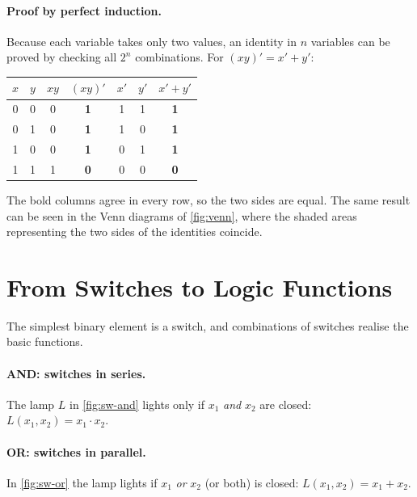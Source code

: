\paragraph{Proof by perfect induction.} Because each variable takes only two values, an identity in $n$ variables can be proved by checking all $2^n$ combinations. For $(xy)'=x'+y'$:

\begin{center}
\begin{tabular}{cc|cc|cc|c}
\toprule
$x$ & $y$ & $xy$ & $(xy)'$ & $x'$ & $y'$ & $x'+y'$\\
\midrule
0&0&0&\textbf{1}&1&1&\textbf{1}\\
0&1&0&\textbf{1}&1&0&\textbf{1}\\
1&0&0&\textbf{1}&0&1&\textbf{1}\\
1&1&1&\textbf{0}&0&0&\textbf{0}\\
\bottomrule
\end{tabular}
\end{center}
The bold columns agree in every row, so the two sides are equal. The same result can be seen in the Venn diagrams of \cref{fig:venn}, where the shaded areas representing the two sides of the identities coincide.


\section{From Switches to Logic Functions}\label{sec:switches-logic}
The simplest binary element is a switch, and combinations of switches realise the basic functions.

\paragraph{AND: switches in series.} The lamp $L$ in \cref{fig:sw-and} lights only if $x_1$ \emph{and} $x_2$ are closed: $L(x_1,x_2) = x_1\cdot x_2$.

\paragraph{OR: switches in parallel.} In \cref{fig:sw-or} the lamp lights if $x_1$ \emph{or} $x_2$ (or both) is closed: $L(x_1,x_2) = x_1+x_2$.


